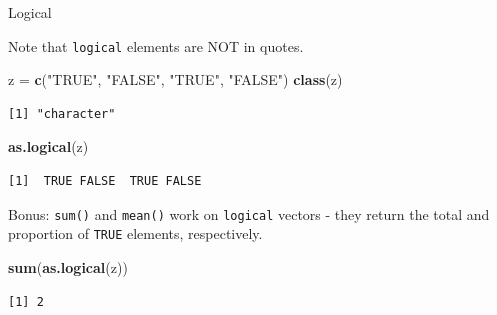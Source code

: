 \documentclass[
  ignorenonframetext,
]{beamer}
\newenvironment{Shaded}{\begin{snugshade}}{\end{snugshade}}
\newcommand{\KeywordTok}[1]{\textcolor[rgb]{0.13,0.29,0.53}{\textbf{#1}}}
\newcommand{\NormalTok}[1]{#1}
\newcommand{\StringTok}[1]{\textcolor[rgb]{0.31,0.60,0.02}{#1}}
\begin{document}
\begin{frame}[fragile]{Logical}
\protect\hypertarget{logical-1}{}

Note that \texttt{logical} elements are NOT in quotes.

\begin{Shaded}
\begin{Highlighting}[]
\NormalTok{z =}\StringTok{ }\KeywordTok{c}\NormalTok{(}\StringTok{"TRUE"}\NormalTok{, }\StringTok{"FALSE"}\NormalTok{, }\StringTok{"TRUE"}\NormalTok{, }\StringTok{"FALSE"}\NormalTok{)}
\KeywordTok{class}\NormalTok{(z)}
\end{Highlighting}
\end{Shaded}

\begin{verbatim}
[1] "character"
\end{verbatim}

\begin{Shaded}
\begin{Highlighting}[]
\KeywordTok{as.logical}\NormalTok{(z)}
\end{Highlighting}
\end{Shaded}

\begin{verbatim}
[1]  TRUE FALSE  TRUE FALSE
\end{verbatim}

Bonus: \texttt{sum()} and \texttt{mean()} work on \texttt{logical}
vectors - they return the total and proportion of \texttt{TRUE}
elements, respectively.

\begin{Shaded}
\begin{Highlighting}[]
\KeywordTok{sum}\NormalTok{(}\KeywordTok{as.logical}\NormalTok{(z))}
\end{Highlighting}
\end{Shaded}

\begin{verbatim}
[1] 2
\end{verbatim}

\end{frame}
\end{document}
